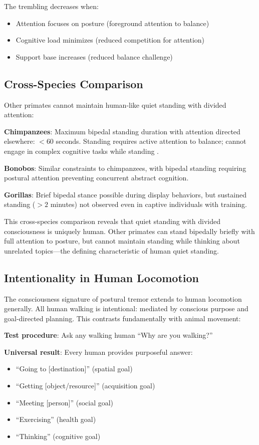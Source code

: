 The trembling decreases when:
\begin{itemize}
\item Attention focuses on posture (foreground attention to balance)
\item Cognitive load minimizes (reduced competition for attention)
\item Support base increases (reduced balance challenge)
\end{itemize}

\subsection{Cross-Species Comparison}

Other primates cannot maintain human-like quiet standing with divided attention:

\textbf{Chimpanzees}: Maximum bipedal standing duration with attention directed elsewhere: $<60$ seconds. Standing requires active attention to balance; cannot engage in complex cognitive tasks while standing \citep{sockol2007chimpanzee}.

\textbf{Bonobos}: Similar constraints to chimpanzees, with bipedal standing requiring postural attention preventing concurrent abstract cognition.

\textbf{Gorillas}: Brief bipedal stance possible during display behaviors, but sustained standing ($>2$ minutes) not observed even in captive individuals with training.

This cross-species comparison reveals that quiet standing with divided consciousness is uniquely human. Other primates can stand bipedally briefly with full attention to posture, but cannot maintain standing while thinking about unrelated topics—the defining characteristic of human quiet standing.

\subsection{Intentionality in Human Locomotion}

The consciousness signature of postural tremor extends to human locomotion generally. All human walking is intentional: mediated by conscious purpose and goal-directed planning. This contrasts fundamentally with animal movement:

\textbf{Test procedure}: Ask any walking human ``Why are you walking?''

\textbf{Universal result}: Every human provides purposeful answer:
\begin{itemize}
\item ``Going to [destination]'' (spatial goal)
\item ``Getting [object/resource]'' (acquisition goal)
\item ``Meeting [person]'' (social goal)
\item ``Exercising'' (health goal)
\item ``Thinking'' (cognitive goal)
\end{itemize}

